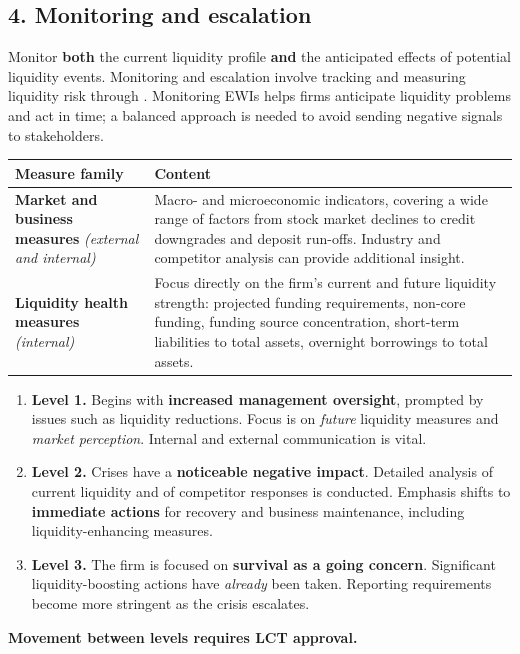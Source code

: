 \subsection{4. Monitoring and escalation}

Monitor \textbf{both} the current liquidity profile \textbf{and} the anticipated effects of potential liquidity events. Monitoring and escalation involve tracking and measuring liquidity risk through . Monitoring EWIs helps firms anticipate liquidity problems and act in time; a balanced approach is needed to avoid sending negative signals to stakeholders.

\begin{center}
\small
\begin{tabularx}{\textwidth}{@{}p{4.6cm} X@{}}
\toprule
\rowcolor{FRMSoft}\textbf{Measure family} & \textbf{Content} \\
\midrule
\textbf{Market and business measures} \newline \emph{(external and internal)} &
Macro- and microeconomic indicators, covering a wide range of factors from stock market declines to credit downgrades and deposit run-offs. Industry and competitor analysis can provide additional insight. \\
\addlinespace
\textbf{Liquidity health measures} \newline \emph{(internal)} &
Focus directly on the firm's current and future liquidity strength: projected funding requirements, non-core funding, funding source concentration, short-term liabilities to total assets, overnight borrowings to total assets. \\
\bottomrule
\end{tabularx}
\end{center}

\begin{lrkeybox}
\begin{enumerate}
\item \textbf{Level 1.} Begins with \textbf{increased management oversight}, prompted by issues such as liquidity reductions. Focus is on \emph{future} liquidity measures and \emph{market perception}. Internal and external communication is vital.
\item \textbf{Level 2.} Crises have a \textbf{noticeable negative impact}. Detailed analysis of current liquidity and of competitor responses is conducted. Emphasis shifts to \textbf{immediate actions} for recovery and business maintenance, including liquidity-enhancing measures.
\item \textbf{Level 3.} The firm is focused on \textbf{survival as a going concern}. Significant liquidity-boosting actions have \emph{already} been taken. Reporting requirements become more stringent as the crisis escalates.
\end{enumerate}
\textbf{Movement between levels requires LCT approval.}
\end{lrkeybox}

